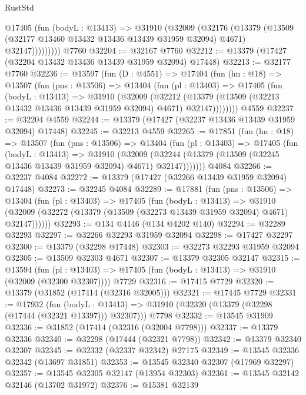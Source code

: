 \begin{lexlean}{RustStd}
\begin{coremodule}
            @17405
              (fun (bodyL : @13413) =>
              @31910
                (@32009
                  (@32176
                    (@13379
                      (@13509 (@32177 @13460 @13432 @13436 @13439 @31959 @32094) @4671)
                      @32147)))))))))
    @7760
@32204 := @32167 @7760
@32212 := @13379 (@17427 (@32204 @13432 @13436 @13439 @31959 @32094) @17448)
@32213 := @32177 @7760
@32236 := @13597
    (fun (D : @4551) =>
    @17404
      (fun (hn : @18) =>
      @13507
        (fun (pns : @13506) =>
        @13404
          (fun (pl : @13403) =>
          @17405
            (fun (bodyL : @13413) =>
            @31910
              (@32009
                (@32212
                  (@13379 (@13509 (@32213 @13432 @13436 @13439 @31959 @32094) @4671) @32147))))))))
    @4559
@32237 := @32204 @4559
@32244 := @13379 (@17427 (@32237 @13436 @13439 @31959 @32094) @17448)
@32245 := @32213 @4559
@32265 := @17851
    (fun (hn : @18) =>
    @13507
      (fun (pns : @13506) =>
      @13404
        (fun (pl : @13403) =>
        @17405
          (fun (bodyL : @13413) =>
          @31910
            (@32009
              (@32244 (@13379 (@13509 (@32245 @13436 @13439 @31959 @32094) @4671) @32147)))))))
    @4084
@32266 := @32237 @4084
@32272 := @13379 (@17427 (@32266 @13439 @31959 @32094) @17448)
@32273 := @32245 @4084
@32289 := @17881
    (fun (pns : @13506) =>
    @13404
      (fun (pl : @13403) =>
      @17405
        (fun (bodyL : @13413) =>
        @31910 (@32009 (@32272 (@13379 (@13509 (@32273 @13439 @31959 @32094) @4671) @32147))))))
@32293 := @134 @4146 (@134 @4202 @140)
@32294 := @32289 @32293
@32297 := @32266 @32293 @31959 @32094
@32298 := @17427 @32297
@32300 := @13379 (@32298 @17448)
@32303 := @32273 @32293 @31959 @32094
@32305 := @13509 @32303 @4671
@32307 := @13379 @32305 @32147
@32315 := @13594
    (fun (pl : @13403) => @17405 (fun (bodyL : @13413) => @31910 (@32009 (@32300 @32307))))
    @7729
@32316 := @17415 @7729
@32320 := @13379 (@31852 (@17414 (@32316 @32005)))
@32321 := @17445 @7729
@32331 := @17932
    (fun (bodyL : @13413) => @31910 (@32320 (@13379 (@32298 (@17444 (@32321 @13397))) @32307)))
    @7798
@32332 := @13545 @31909
@32336 := @31852 (@17414 (@32316 (@32004 @7798)))
@32337 := @13379 @32336
@32340 := @32298 (@17444 (@32321 @7798))
@32342 := @13379 @32340 @32307
@32345 := @32332 (@32337 @32342) @27175
@32349 := @13545 @32336 @32342 (@13697 @31851)
@32353 := @13545 @32340 @32307 (@17969 @32297)
@32357 := @13545 @32305 @32147 (@13954 @32303)
@32361 := @13545 @32142 @32146 (@13702 @31972)
@32376 := @15381
    @32139

\end{coremodule}
\end{lexlean}
